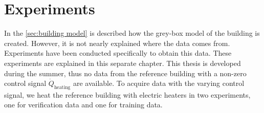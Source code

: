 \chapter{Experiments}
\label{ch:experiments}
In the \autoref{sec:building model} is described how the grey-box model of the building is created. However, it is not nearly explained where the data comes from. Experiments have been conducted specifically to obtain this data. These experiments are explained in this separate chapter. \newline
This thesis is developed during the summer, thus no data from the reference building with a non-zero control signal $\dot{Q}_\text{heating}$ are available. To acquire data with the varying control signal, we heat the reference building with electric heaters in two experiments, one for verification data and one for training data.

